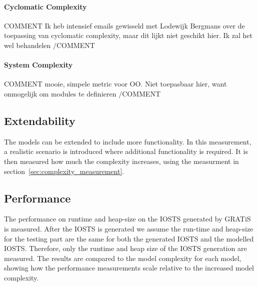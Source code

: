 \paragraph*{Cyclomatic Complexity} COMMENT Ik heb intensief emails gewisseld met Lodewijk Bergmans over de toepassing van cyclomatic complexity, maar dit lijkt niet geschikt hier. Ik zal het wel behandelen $/$COMMENT

\paragraph*{System Complexity} COMMENT mooie, simpele metric voor OO. Niet toepasbaar hier, want onmogelijk om modules te definieren $/$COMMENT

\subsection{Extendability}
The models can be extended to include more functionality. In this measurement, a realistic scenario is introduced where additional functionality is required. It is then measured how much the complexity increases, using the measurment in section~\ref{sec:complexity_measurement}.

\subsection{Performance}
The performance on runtime and heap-size on the IOSTS generated by GRATiS is measured. After the IOSTS is generated we assume the run-time and heap-size for the testing part are the same for both the generated IOSTS and the modelled IOSTS. Therefore, only the runtime and heap size of the IOSTS generation are measured. The results are compared to the model complexity for each model, showing how the performance measurements scale relative to the increased model complexity.
